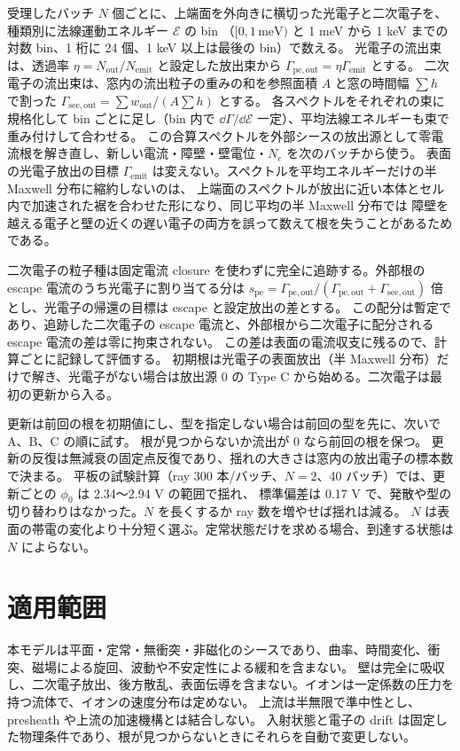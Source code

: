 受理したバッチ $N$ 個ごとに、上端面を外向きに横切った光電子と二次電子を、種類別に法線運動エネルギー $\mathcal E$ の bin
（$[0,1\,\mathrm{meV})$ と 1 meV から 1 keV までの対数 bin、1 桁に 24 個、1 keV 以上は最後の bin）で数える。
光電子の流出束は、透過率 $\eta=N_{\mathrm{out}}/N_{\mathrm{emit}}$ と設定した放出束から $\Gamma_{\mathrm{pe,out}}=\eta\Gamma_{\mathrm{emit}}$ とする。
二次電子の流出束は、窓内の流出粒子の重みの和を参照面積 $A$ と窓の時間幅 $\sum h$ で割った
$\Gamma_{\mathrm{see,out}}=\sum w_{\mathrm{out}}/(A\sum h)$ とする。
各スペクトルをそれぞれの束に規格化して bin ごとに足し（bin 内で $\dd\Gamma/\dd\mathcal E$ 一定）、平均法線エネルギーも束で重み付けして合わせる。
この合算スペクトルを外部シースの放出源として零電流根を解き直し、新しい電流・障壁・壁電位・$N_e$ を次のバッチから使う。
表面の光電子放出の目標 $\Gamma_{\mathrm{emit}}$ は変えない。スペクトルを平均エネルギーだけの半 Maxwell 分布に縮約しないのは、
上端面のスペクトルが放出に近い本体とセル内で加速された裾を合わせた形になり、同じ平均の半 Maxwell 分布では
障壁を越える電子と壁の近くの遅い電子の両方を誤って数えて根を失うことがあるためである。

二次電子の粒子種は固定電流 closure を使わずに完全に追跡する。外部根の escape 電流のうち光電子に割り当てる分は
$s_{\mathrm{pe}}=\Gamma_{\mathrm{pe,out}}/(\Gamma_{\mathrm{pe,out}}+\Gamma_{\mathrm{see,out}})$ 倍とし、光電子の帰還の目標は escape と設定放出の差とする。
この配分は暫定であり、追跡した二次電子の escape 電流と、外部根から二次電子に配分される escape 電流の差は零に拘束されない。
この差は表面の電流収支に残るので、計算ごとに記録して評価する。
初期根は光電子の表面放出（半 Maxwell 分布）だけで解き、光電子がない場合は放出源 0 の Type C から始める。二次電子は最初の更新から入る。

更新は前回の根を初期値にし、型を指定しない場合は前回の型を先に、次いで A、B、C の順に試す。
根が見つからないか流出が 0 なら前回の根を保つ。
更新の反復は無減衰の固定点反復であり、揺れの大きさは窓内の放出電子の標本数で決まる。
平板の試験計算（ray 300 本/バッチ、$N=2$、40 バッチ）では、更新ごとの $\phi_0$ は 2.34〜2.94 V の範囲で揺れ、
標準偏差は 0.17 V で、発散や型の切り替わりはなかった。$N$ を長くするか ray 数を増やせば揺れは減る。
$N$ は表面の帯電の変化より十分短く選ぶ。定常状態だけを求める場合、到達する状態は $N$ によらない。

\section{適用範囲}
\label{sec:sm_limits}
本モデルは平面・定常・無衝突・非磁化のシースであり、曲率、時間変化、衝突、磁場による旋回、波動や不安定性による緩和を含まない。
壁は完全に吸収し、二次電子放出、後方散乱、表面伝導を含まない。イオンは一定係数の圧力を持つ流体で、イオンの速度分布は定めない。
上流は半無限で準中性とし、presheath や上流の加速機構とは結合しない。
入射状態と電子の drift は固定した物理条件であり、根が見つからないときにそれらを自動で変更しない。

